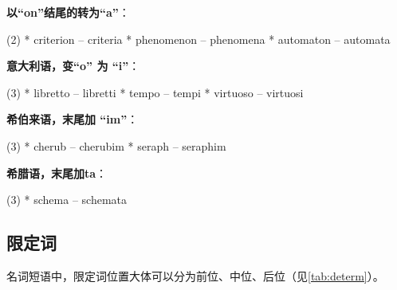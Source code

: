 \begin{description}
  \textbf{以``on''结尾的转为``a''}：
  \begin{taskitem}(2)
    *  criterion -- criteria
    *  phenomenon -- phenomena
    *  automaton -- automata
  \end{taskitem}


  \textbf{意大利语，变``o'' 为 ``i''}：
  \begin{taskitem}(3)
    *  libretto -- libretti
    *  tempo -- tempi
    *  virtuoso -- virtuosi
  \end{taskitem}

  \textbf{希伯来语，末尾加 ``im''}：
  \begin{taskitem}(3)
    *  cherub -- cherubim
    *  seraph -- seraphim
  \end{taskitem}

  \textbf{希腊语，末尾加ta}：
  \begin{taskitem}(3)
    *  schema -- schemata
  \end{taskitem}
\end{description}

\subsection{限定词}

名词短语中，限定词位置大体可以分为前位、中位、后位（见\cref{tab:determ}）。

